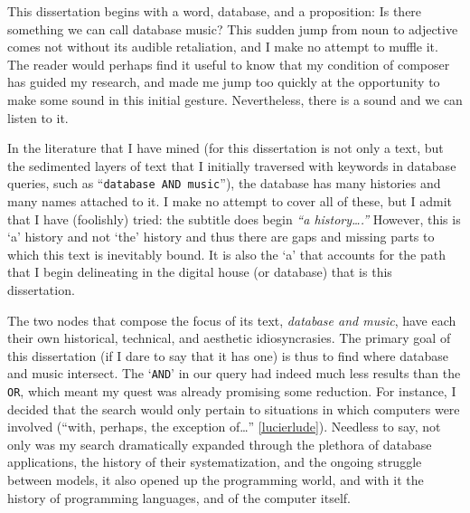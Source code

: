 This dissertation begins with a word, database, and a proposition: Is there something we can call database music? This sudden jump from noun to adjective comes not without its audible retaliation, and I make no attempt to muffle it. The reader would perhaps find it useful to know that my condition of composer has guided my research, and made me jump too quickly at the opportunity to make some sound in this initial gesture. Nevertheless, there is a sound and we can listen to it. %


In the literature that I have mined (for this dissertation is not only a text, but the sedimented layers of text that I initially traversed with keywords in database queries, such as ``\texttt{database AND music}''), the database has many histories and many names attached to it. I make no attempt to cover all of these, but I admit that I have (foolishly) tried: the subtitle does begin \textit{``a history\dots.''} However, this is `a’ history and not `the’ history and thus there are gaps and missing parts to which this text is inevitably bound. It is also the `a' that accounts for the path that I begin delineating in the digital house (or database) that is this dissertation. 

The two nodes that compose the focus of its text, \textit{database and music}, have each their own historical, technical, and aesthetic idiosyncrasies. The primary goal of this dissertation (if I dare to say that it has one) is thus to find where database and music intersect. The `\texttt{AND}' in our query had indeed much less results than the \texttt{OR}, which meant my quest was already promising some reduction. For instance, I decided that the search would only pertain to situations in which computers were involved (``with, perhaps, the exception of\dots'' \ref{lucierlude}). Needless to say, not only was my search dramatically expanded through the plethora of database applications, the history of their systematization, and the ongoing struggle between models, it also opened up the programming world, and with it the history of programming languages, and of the computer itself. 


